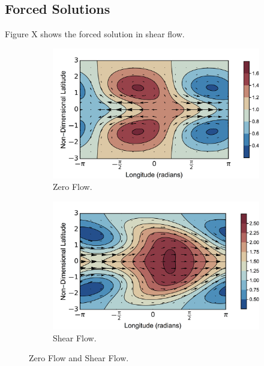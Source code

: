 \subsection{Forced Solutions}

Figure X shows the forced solution in shear flow.


\begin{figure}
  \centering
  \begin{subfigure}[b]{0.49\textwidth}
    \includegraphics[width=\textwidth]{figures/wave-mean-flow/ps-no-flow.png}
    \caption{Zero Flow.}
    \label{fig:ps-no-flow}
  \end{subfigure}
  \begin{subfigure}[b]{0.49\textwidth}
    \includegraphics[width=\textwidth]{figures/wave-mean-flow/ps-shear-flow.png}
    \caption{Shear Flow.}
    \label{fig:ps-shear-flow}
  \end{subfigure}
  \caption{Zero Flow and Shear Flow.}
  \label{fig:ps-flow}
\end{figure}


